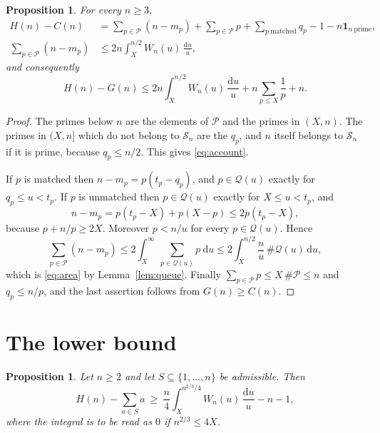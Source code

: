\documentclass[11pt,reqno]{amsart}
\newtheorem{proposition}[theorem]{Proposition}
\theoremstyle{definition}
\theoremstyle{remark}
\numberwithin{equation}{section}
\newcommand{\dd}{\mathrm{d}}
\newcommand{\cP}{\mathcal{P}}
\newcommand{\cQ}{\mathcal{Q}}
\newcommand{\cS}{\mathcal{S}}
\begin{document}
\begin{proposition}\label{prop:upper}
For every $n\ge3$,
\begin{align}
 H(n)-C(n)&=\sum_{p\in\cP}(n-m_p)+\sum_{p\in\cP}p+\sum_{p\ \mathrm{matched}}q_p-1-n\mathbf 1_{n\ \mathrm{prime}},\label{eq:account}\\
 \sum_{p\in\cP}(n-m_p)&\le2n\int_X^{n/2}W_n(u)\,\frac{\dd u}{u},\label{eq:area}
\end{align}
and consequently
\[
 H(n)-G(n)\le2n\int_X^{n/2}W_n(u)\,\frac{\dd u}{u}+n\sum_{p\le X}\frac1p+n.
\]
\end{proposition}

\begin{proof}
The primes below $n$ are the elements of $\cP$ and the primes in $(X,n)$. The primes in $(X,n]$ which do not belong to $\cS_n$ are the $q_p$, and $n$ itself belongs to $\cS_n$ if it is prime, because $q_p\le n/2$. This gives \eqref{eq:account}.

If $p$ is matched then $n-m_p=p(t_p-q_p)$, and $p\in\cQ(u)$ exactly for $q_p\le u<t_p$. If $p$ is unmatched then $p\in\cQ(u)$ exactly for $X\le u<t_p$, and
\[
 n-m_p=p(t_p-X)+p(X-p)\le2p(t_p-X),
\]
because $p+n/p\ge2X$. Moreover $p<n/u$ for every $p\in\cQ(u)$. Hence
\[
 \sum_{p\in\cP}(n-m_p)\le2\int_X^{\infty}\ \sum_{p\in\cQ(u)}p\ \dd u\le2\int_X^{n/2}\frac nu\,\#\cQ(u)\,\dd u,
\]
which is \eqref{eq:area} by Lemma~\ref{lem:queue}. Finally $\sum_{p\in\cP}p\le X\,\#\cP\le n$ and $q_p\le n/p$, and the last assertion follows from $G(n)\ge C(n)$.
\end{proof}

\section{The lower bound}\label{sec:lower}

\begin{proposition}\label{prop:lower}
Let $n\ge2$ and let $S\subseteq\{1,\dots,n\}$ be admissible. Then
\[
 H(n)-\sum_{a\in S}a\ \ge\ \frac n4\int_X^{n^{2/3}/4}W_n(u)\,\frac{\dd u}{u}-n-1,
\]
where the integral is to be read as $0$ if $n^{2/3}\le4X$.
\end{proposition}
\end{document}
